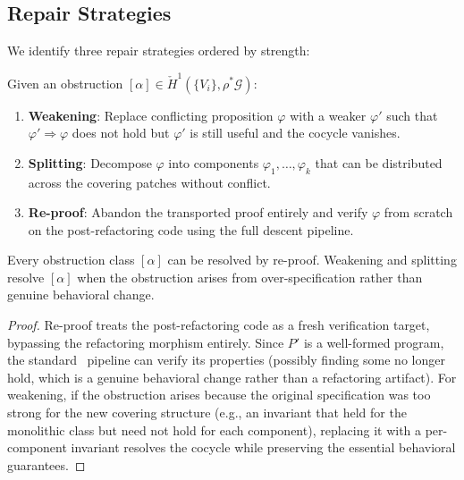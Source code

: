 \documentclass[11pt]{article}
\newcommand{\RefactorMorph}{\rho}
\begin{document}
\subsection{Repair Strategies}\label{ssec:repair-strategies}

We identify three repair strategies ordered by strength:

\begin{definition}\label{def:repair-hierarchy}
Given an obstruction $[\alpha] \in \check{H}^1(\{V_i\},
\RefactorMorph^*\mathcal{G})$:
\begin{enumerate}[noitemsep]
  \item \textbf{Weakening}: Replace conflicting proposition $\varphi$
        with a weaker $\varphi'$ such that $\varphi' \Rightarrow
        \varphi$ does not hold but $\varphi'$ is still useful and the
        cocycle vanishes.
  \item \textbf{Splitting}: Decompose $\varphi$ into components
        $\varphi_1, \ldots, \varphi_k$ that can be distributed across
        the covering patches without conflict.
  \item \textbf{Re-proof}: Abandon the transported proof entirely and
        verify $\varphi$ from scratch on the post-refactoring code using
        the full descent pipeline.
\end{enumerate}
\end{definition}

\begin{proposition}\label{prop:repair-complete}
Every obstruction class $[\alpha]$ can be resolved by re-proof.
Weakening and splitting resolve $[\alpha]$ when the obstruction arises
from over-specification rather than genuine behavioral change.
\end{proposition}

\begin{proof}
Re-proof treats the post-refactoring code as a fresh verification
target, bypassing the refactoring morphism entirely.  Since $P'$ is a
well-formed program, the standard \JuGeo\ pipeline can verify its
properties (possibly finding some no longer hold, which is a genuine
behavioral change rather than a refactoring artifact).  For weakening,
if the obstruction arises because the original specification was too
strong for the new covering structure (e.g., an invariant that held for
the monolithic class but need not hold for each component), replacing
it with a per-component invariant resolves the cocycle while preserving
the essential behavioral guarantees.
\end{proof}
\end{document}
